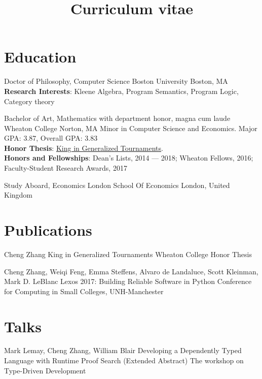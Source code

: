 \documentclass[11pt,a4paper,roman]{moderncv}        %
\title{Curriculum vitae}
\begin{document}

\makecvtitle{}

\setlength{\parskip}{2.5px}
\linespread{1.3}
\selectfont


\section{Education}

{Doctor of Philosophy, Computer Science} {}
{Boston University}
{Boston, MA}
{\textbf{Research Interests}: Kleene Algebra, Program Semantics, Program Logic, Category theory}  %

{Bachelor of Art, Mathematics} {with department honor, magna cum laude}
{Wheaton College}
{Norton, MA}
{Minor in Computer Science and Economics.
Major GPA\@: 3.87, Overall GPA\@: 3.83\\
\textbf{Honor Thesis}: 
  \href{http://hdl.handle.net/11040/24570}{King in Generalized Tournaments}.\\
\textbf{Honors and Fellowships}: Dean's Lists, 2014 --- 2018;
Wheaton Fellows, 2016;
Faculty-Student Research Awards, 2017
}

{Study Aboard, Economics} {}
{London School Of Economics}
{London, United Kingdom}
{}  %



\section{Publications}

{Cheng Zhang}
{King in Generalized Tournaments}
{Wheaton College Honor Thesis}
{}{}

{Cheng Zhang, Weiqi Feng, Emma Steffens, Alvaro de Landaluce, Scott Kleinman, Mark D. LeBlanc}
{Lexos 2017: Building Reliable Software in Python}
{Conference for Computing in Small Colleges, UNH-Manchester}
{}{}


\section{Talks}

{Mark Lemay, Cheng Zhang, William Blair}
{Developing a Dependently Typed Language with Runtime Proof Search (Extended Abstract)}
{The workshop on Type-Driven Development}
{}{}
\end{document}
